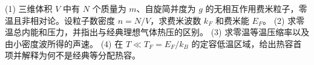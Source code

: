 (1) 三维体积 \(V\) 中有 \(N\) 个质量为 \(m\)、自旋简并度为 \(g\) 的无相互作用费米粒子，零温且非相对论。设粒子数密度 \(n=N/V\)，求费米波数 \(k_F\) 和费米能 \(E_F\)。
(2) 求零温总内能和压力，并指出与经典理想气体热压的区别。
(3) 求零温等温压缩率以及由小密度波所得的声速。
(4) 在 \(T\ll T_F=E_F/k_B\) 的定容低温区域，给出热容首项并解释为何不是经典等分配热容。
